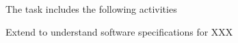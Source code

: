 \begin{task}[
  title=Support more software specification standards
  id=patterns,
  lead=SRL,
  PM=1,
  wphases={0-36},
  partners={??}
  ]
  The task includes the following activities
  \begin{compactitem}
  \item Extend \repotodocker{} to understand software specifications for XXX
  \end{compactitem}
\end{task}
